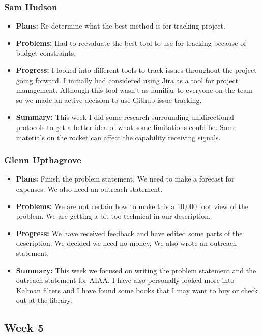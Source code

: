 \documentclass[onecolumn, draftclsnofoot,10pt, compsoc]{IEEEtran}
\begin{document}
\subsubsection{Sam Hudson}
\begin {itemize}
\item \textbf{Plans: }Re-determine what the best method is for tracking project.
\item \textbf{Problems: }Had to reevaluate the best tool to use for tracking because of budget constraints.
\item \textbf{Progress: }I looked into different tools to track issues throughout the project going forward. I initially had considered using Jira as a tool for project management. Although this tool wasn't as familiar to everyone on the team so we made an active decision to use Github issue tracking. 
\item \textbf{Summary: }This week I did some research surrounding unidirectional protocols to get a better idea of what some limitations could be. Some materials on the rocket can affect the capability receiving signals. 
\end {itemize}
\subsubsection{Glenn Upthagrove}
\begin {itemize}
 \item \textbf{Plans: }Finish the problem statement. We need to make a forecast for expenses. We also need an outreach statement. 
 \item \textbf{Problems: }We are not certain how to make this a 10,000 foot view of the problem. We are getting a bit too technical in our description. 
 \item \textbf{Progress: }We have received feedback and have edited some parts of the description. We decided we need no money. We also wrote an outreach statement. 
 \item \textbf{Summary: }This week we focused on writing the problem statement and the outreach statement for AIAA. I have also personally looked more into Kalman filters and I have found some books that I may want to buy or check out at the library.  
\end {itemize}
\subsection {Week 5}
\end{document}
